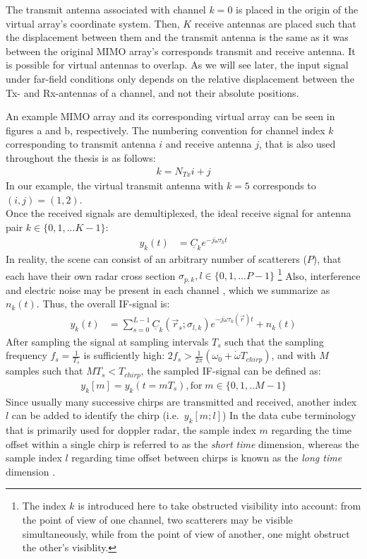 The transmit antenna associated with channel $k=0$ is placed in the origin of the virtual array's coordinate system.
Then, $K$ receive antennas are placed such that the displacement between them and the transmit antenna
is the same as it was between the original MIMO array's corresponds transmit and receive antenna.
It is possible for virtual antennas to overlap.
As we will see later, the input signal under far-field conditions only depends
on the relative displacement between the Tx- and Rx-antennas of a channel, and not their absolute positions.

An example MIMO array and its corresponding virtual array can be seen in figures a and b, respectively.
The numbering convention for channel index $k$ corresponding to transmit antenna $i$ and receive antenna $j$,
that is also used throughout the thesis is as follows:
\begin{align}
    k = N_{Tx}i + j
\end{align}
In our example, the virtual transmit antenna with $k=5$ corresponds to $(i,j)=(1,2)$. \\

Once the received signals are demultiplexed, the ideal receive signal for antenna pair $k \in \{0,1,...K-1\}$:
\begin{align}
    y_k(t) & = \underline C_k e^{-j\dot\omega\tau_k t} \label{eqn:ideal_scatterer}
\end{align}
In reality, the scene can consist of an arbitrary number of scatterers ($P$),
that each have their own radar cross section $\sigma_{p,k}, l \in \{0,1,...P-1\}$
\footnote{
    The index $k$ is introduced here to take obstructed visibility into account:
    from the point of view of one channel, two scatterers may be visible simultaneously,
    while from the point of view of another, one might obstruct the other's visiblity.
}
Also, interference and electric noise may be present in each channel \parencite[see][ch. 4]{jankiraman},
which we summarize as $n_k(t)$. Thus, the overall IF-signal is:
\begin{align}
    y_k(t) & = \sum_{s=0}^{L-1} \underline C_k(\vec r_s; \sigma_{l,k}) e^{-j\dot\omega\tau_k(\vec r)t} + n_k(t)
\end{align}
After sampling the signal at sampling intervals $T_s$ such that the sampling frequency $f_s = \frac{1}{T_s}$
is sufficiently high: ${2f_s > \frac{1}{2\pi}(\omega_0 + \dot \omega T_{chirp})}$, and with $M$ samples such that $MT_s < T_{chirp}$,
the sampled IF-signal can be defined as:
\begin{align}
    y_k[m] = y_k(t=mT_s), \text{for}\;m \in \{0,1,..M-1\}
\end{align}
Since usually many successive chirps are transmitted and received,
another index $l$ can be added to identify the chirp (i.e.\ $y_{k}[m;l]$)
In the data cube terminology that is primarily used for doppler radar,
the sample index $m$ regarding the time offset within a single chirp
is referred to as the \emph{short time} dimension,
whereas the sample index $l$ regarding time offset between chirps
is known as the \emph{long time} dimension \parencite[see][pp. 290f.]{richards}.


